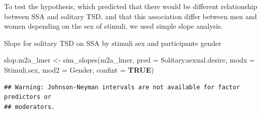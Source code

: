 \documentclass[
  bookmarksnumbered]{article}
\newenvironment{Shaded}{\begin{snugshade}}{\end{snugshade}}
\newcommand{\AttributeTok}[1]{\textcolor[rgb]{0.80,0.80,0.80}{#1}}
\newcommand{\ConstantTok}[1]{\textcolor[rgb]{0.86,0.64,0.64}{\textbf{#1}}}
\newcommand{\FunctionTok}[1]{\textcolor[rgb]{0.94,0.94,0.56}{#1}}
\newcommand{\NormalTok}[1]{\textcolor[rgb]{0.80,0.80,0.80}{#1}}
\newcommand{\OtherTok}[1]{\textcolor[rgb]{0.94,0.94,0.56}{#1}}
\begin{document}
To test the hypothesis, which predicted that there would be different relationship between SSA and solitary TSD, and that this association differ between men and women depending on the sex of stimuli, we used simple slope analysis.

Slope for solitary TSD on SSA by stimuli sex and participante gender

\begin{Shaded}
\begin{Highlighting}[]
\NormalTok{slop.m2a\_lmer }\OtherTok{\textless{}{-}} \FunctionTok{sim\_slopes}\NormalTok{(m2a\_lmer, }
                            \AttributeTok{pred =}\NormalTok{ Solitary.sexual.desire, }
                            \AttributeTok{modx =}\NormalTok{ Stimuli.sex, }
                            \AttributeTok{mod2 =}\NormalTok{ Gender,}
                            \AttributeTok{confint =} \ConstantTok{TRUE}\NormalTok{)}
\end{Highlighting}
\end{Shaded}

\begin{verbatim}
## Warning: Johnson-Neyman intervals are not available for factor predictors or
## moderators.
\end{verbatim}
\end{document}
